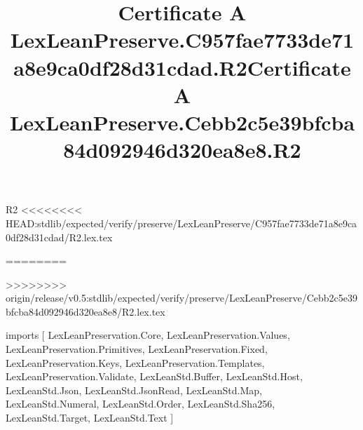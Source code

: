 \begin{lexlean}{R2}
<<<<<<<< HEAD:stdlib/expected/verify/preserve/LexLeanPreserve/C957fae7733de71a8e9ca0df28d31cdad/R2.lex.tex
\title{Certificate A LexLeanPreserve.C957fae7733de71a8e9ca0df28d31cdad.R2}
========
\title{Certificate A LexLeanPreserve.Cebb2c5e39bfcba84d092946d320ea8e8.R2}
>>>>>>>> origin/release/v0.5:stdlib/expected/verify/preserve/LexLeanPreserve/Cebb2c5e39bfcba84d092946d320ea8e8/R2.lex.tex
\begin{coremodule}
imports [
  LexLeanPreservation.Core,
  LexLeanPreservation.Values,
  LexLeanPreservation.Primitives,
  LexLeanPreservation.Fixed,
  LexLeanPreservation.Keys,
  LexLeanPreservation.Templates,
  LexLeanPreservation.Validate,
  LexLeanStd.Buffer,
  LexLeanStd.Host,
  LexLeanStd.Json,
  LexLeanStd.JsonRead,
  LexLeanStd.Map,
  LexLeanStd.Numeral,
  LexLeanStd.Order,
  LexLeanStd.Sha256,
  LexLeanStd.Target,
  LexLeanStd.Text
]


\end{coremodule}
\end{lexlean}
